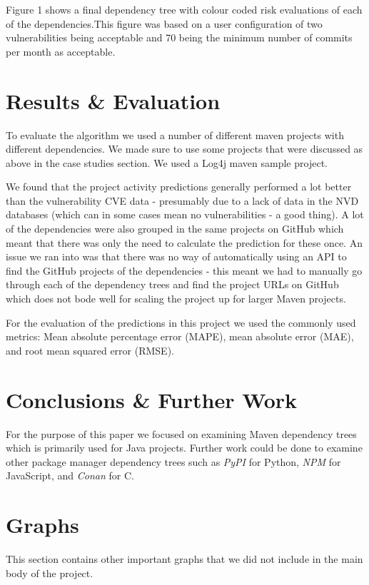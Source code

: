 \documentclass[10pt, onecolumn, compsoc, conference]{IEEEtran}
\begin{document}
Figure 1 shows a final dependency tree with colour coded risk evaluations of each of the dependencies.This figure was based on a user configuration of two vulnerabilities being acceptable and 70 being the minimum number of commits per month as acceptable. 


\section{Results \& Evaluation}
To evaluate the algorithm we used a number of different maven projects with different dependencies. We made sure to use some projects that were discussed as above in the case studies section. We used a Log4j maven sample project. 

We found that the project activity predictions generally performed a lot better than the vulnerability CVE data - presumably due to a lack of data in the NVD databases (which can in some cases mean no vulnerabilities - a good thing). A lot of the dependencies were also grouped in the same projects on GitHub which meant that there was only the need to calculate the prediction for these once. An issue we ran into was that there was no way of automatically using an API to find the GitHub projects of the dependencies - this meant we had to manually go through each of the dependency trees and find the project URLs on GitHub which does not bode well for scaling the project up for larger Maven projects. 

For the evaluation of the predictions in this project we used the commonly used metrics: Mean absolute percentage error (MAPE), mean absolute error (MAE), and root mean squared error (RMSE). 

\section{Conclusions \& Further Work}
For the purpose of this paper we focused on examining Maven dependency trees which is primarily used for Java projects. Further work could be done to examine other package manager dependency trees such as \textit{PyPI} for Python, \textit{NPM} for JavaScript, and \textit{Conan} for C. 

\printbibliography

\appendices
\section{Graphs}
This section contains other important graphs that we did not include in the main body of the project.

\ifCLASSOPTIONcaptionsoff
  \newpage
\fi
\end{document}
